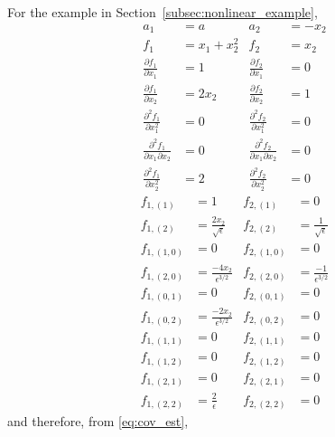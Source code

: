 \documentclass[12pt]{article}
\begin{document}
For the example in Section~\ref{subsec:nonlinear_example}, 
\begin{equation}
\begin{aligned}
a_1 &= a 
&
a_2 &= -x_2
\\
f_1 &= x_1 + x_2^2 
&
f_2 &= x_2 
\\
\frac{\partial f_1}{\partial x_1} &= 1
&
\frac{\partial f_2}{\partial x_1} &= 0 
\\
\frac{\partial f_1}{\partial x_2} &= 2 x_2
&
\frac{\partial f_2}{\partial x_2} &= 1 
\\
\frac{\partial^2 f_1}{\partial x_1^2} &= 0
&
\frac{\partial^2 f_2}{\partial x_1^2} &= 0
\\
\frac{\partial^2 f_1}{\partial x_1 \partial x_2} &= 0
&
\frac{\partial^2 f_2}{\partial x_1 \partial x_2} &= 0
\\
\frac{\partial^2 f_1}{\partial x_2^2 } &= 2
&
\frac{\partial^2 f_2}{\partial x_2^2} &= 0
\end{aligned}
\end{equation}
%
\begin{equation}
\begin{aligned}
f_{1,(1)} &= 1
&
f_{2,(1)} &= 0
\\
f_{1,(2)} &= \frac{2 x_2}{\sqrt{\epsilon}}
&
f_{2,(2)} &= \frac{1}{\sqrt{\epsilon}}
\\
f_{1,(1,0)} &= 0
&
f_{2,(1,0)} &= 0
\\
f_{1,(2,0)} &= \frac{-4 x_2}{\epsilon^{3/2}} 
&
f_{2,(2,0)} &= \frac{-1}{\epsilon^{3/2}}
\\
f_{1,(0,1)} &= 0
&
f_{2,(0,1)} &= 0
\\
f_{1,(0,2)} &= \frac{-2 x_2}{\epsilon^{3/2}} 
&
f_{2,(0,2)} &= 0
\\
f_{1,(1,1)} &= 0
&
f_{2,(1,1)} &= 0
\\
f_{1,(1,2)} &= 0
&
f_{2,(1,2)} &= 0
\\
f_{1,(2,1)} &= 0
&
f_{2,(2,1)} &= 0
\\
f_{1,(2,2)} &= \frac{2}{\epsilon}
&
f_{2,(2,2)} &= 0
\end{aligned}
\end{equation}
%
and therefore, from \eqref{eq:cov_est}, 
%
\end{document}
